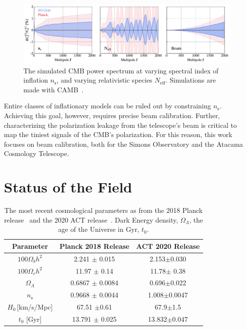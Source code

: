 \begin{figure}[t!]
    \centering
    \includegraphics[width = \textwidth]{Figures/beam_neff.pdf}
    \caption{The simulated CMB power spectrum at varying spectral index of inflation $n_\text{s}$, and varying relativistic species $N_{\text{eff}}$.  Simulations are made with CAMB~\cite{camb_online}.}
    \label{fig:cmb_ns}
\end{figure}

Entire classes of inflationary models can be ruled out by constraining $n_{\text{s}}$.  Achieving this goal, however, requires precise beam calibration.  Further, characterizing the polarization leakage from the telescope's beam is critical to map the tiniest signals of the CMB's polarization.  For this reason, this work focuses on beam calibration, both for the Simons Observatory and the Atacama Cosmology Telescope.

\section{Status of the Field}
\begin{table}[b]
    \centering
    \begin{tabular}{|c|c|c|}\hline 
         Parameter & Planck 2018 Release & ACT 2020 Release \\ \hline
         $100\Omega_b h^2$ &  2.241 $\pm$ 0.015 &2.153$\pm$0.030 \\
         $100\Omega_c h^2$ & 11.97 $\pm$ 0.14 & 11.78$\pm$ 0.38\\
         $\Omega_\Lambda$ & 0.6867 $\pm$ 0.0084 & 0.696$\pm$0.022\\
         $n_{\text{s}}$ & 0.9668 $\pm$ 0.0044 & 1.008$\pm$0.0047\\
         $H_0$\,[km/s/Mpc] & 67.51 $\pm$0.61 & 67.9$\pm$1.5\\ 
         $t_0$ [Gyr] & 13.791 $\pm$ 0.025 & 13.832$\pm$0.047\\
         \hline
    \end{tabular}
    \caption{The most recent cosmological parameters as from the 2018 Planck release~\cite{planck2020} and the 2020 ACT release~\cite{aiola_2020}.  Dark Energy density, $\Omega_\Lambda$, the age of the Universe in Gyr, $t_0$.}
    \label{tab:cosmology_recent_results}
\end{table}

